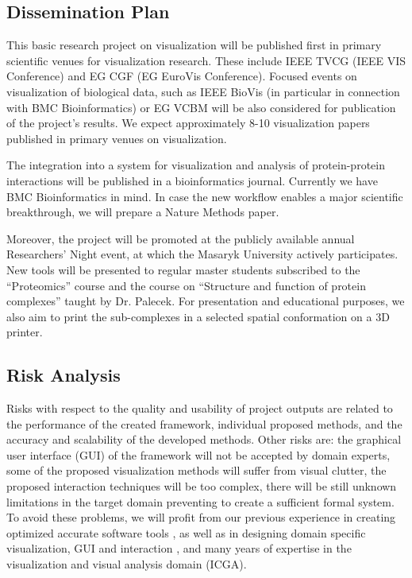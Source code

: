 \documentclass[11pt,a4paper,titlepage,oneside,onecolumn]{article}
\begin{document}
\subsection{Dissemination Plan}
This basic research project on visualization will be published first in primary scientific venues for visualization research. These include IEEE TVCG (IEEE VIS Conference) and EG CGF (EG EuroVis Conference). Focused events on visualization of biological data, such as IEEE BioVis (in particular in connection with BMC Bioinformatics) or EG VCBM will be also considered for publication of the project's results. We expect approximately 8-10 visualization papers published in primary venues on visualization.

The integration into a system for visualization and analysis of protein-protein interactions will be published in a bioinformatics journal. Currently we have BMC Bioinformatics in mind. In case the new workflow enables a major scientific breakthrough, we will prepare a Nature Methods paper. 


Moreover, the project will be promoted at the publicly available annual Researchers' Night event, at which the Masaryk University actively participates. New tools will be presented to regular master students subscribed to the “Proteomics” course and the course on “Structure and function of protein complexes” taught by Dr. Palecek. For presentation and educational purposes, we also aim to print the sub-complexes in a selected spatial conformation on a 3D printer. 

\subsection{Risk Analysis}
Risks with respect to the quality and usability of project outputs are related to the performance of the created framework,  individual proposed methods, and the accuracy and scalability of the developed methods. Other risks are: the graphical user interface (GUI) of the framework will not be accepted by domain experts, some of the proposed visualization methods will suffer from visual clutter, the proposed interaction techniques will be too complex, there will be still unknown limitations in the target domain preventing to create a sufficient formal system.
To avoid these problems, we will profit from our previous experience in creating optimized accurate software tools \cite{caver}, as well as in designing domain specific visualization, GUI and interaction \cite{analyst}, and many years of expertise in the visualization and visual analysis domain (ICGA). 
\end{document}

